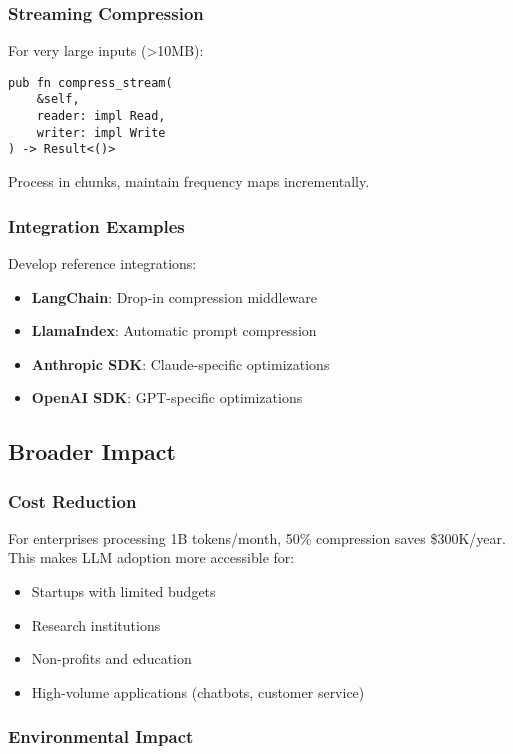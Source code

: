 \subsubsection{Streaming Compression}

For very large inputs (>10MB):

\begin{verbatim}
pub fn compress_stream(
    &self,
    reader: impl Read,
    writer: impl Write
) -> Result<()>
\end{verbatim}

Process in chunks, maintain frequency maps incrementally.

\subsubsection{Integration Examples}

Develop reference integrations:

\begin{itemize}
    \item \textbf{LangChain}: Drop-in compression middleware
    \item \textbf{LlamaIndex}: Automatic prompt compression
    \item \textbf{Anthropic SDK}: Claude-specific optimizations
    \item \textbf{OpenAI SDK}: GPT-specific optimizations
\end{itemize}

\subsection{Broader Impact}

\subsubsection{Cost Reduction}

For enterprises processing 1B tokens/month, 50\% compression saves \$300K/year. This makes LLM adoption more accessible for:
\begin{itemize}
    \item Startups with limited budgets
    \item Research institutions
    \item Non-profits and education
    \item High-volume applications (chatbots, customer service)
\end{itemize}

\subsubsection{Environmental Impact}

